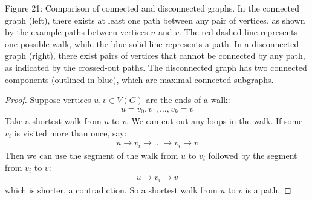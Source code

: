 \documentclass{article}
\theoremstyle{definition}
\begin{document}
\vspace{0.3cm}
{\centering
\footnotesize Figure 21: Comparison of connected and disconnected graphs. In the connected graph (left), there exists at least one path between any pair of vertices, as shown by the example paths between vertices $u$ and $v$. The red dashed line represents one possible walk, while the blue solid line represents a path. In a disconnected graph (right), there exist pairs of vertices that cannot be connected by any path, as indicated by the crossed-out paths. The disconnected graph has two connected components (outlined in blue), which are maximal connected subgraphs.
\par}

\begin{proof}
Suppose vertices $u, v \in V(G)$ are the ends of a walk:
\begin{align*}
u = v_0, v_1, \ldots, v_k = v
\end{align*}
Take a shortest walk from $u$ to $v$. We can cut out any loops in the walk.
If some $v_i$ is visited more than once, say:
\begin{align*}
u \to v_i \to \ldots \to v_i \to v
\end{align*}
Then we can use the segment of the walk from $u$ to $v_i$ followed by the segment from $v_i$ to $v$:
\begin{align*}
u \to v_i \to v
\end{align*}
which is shorter, a contradiction.
So a shortest walk from $u$ to $v$ is a path.
\end{proof}
\end{document}
